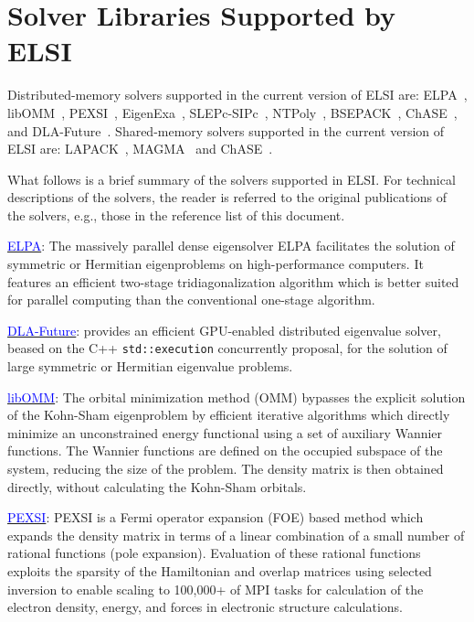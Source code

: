 \documentclass{report}
\newcommand{\tcb}[1]{\textcolor{blue}{#1}}
\begin{document}
\section{Solver Libraries Supported by ELSI}
\label{sec:solvers}
Distributed-memory solvers supported in the current version of ELSI are: ELPA~\cite{elpa_auckenthaler_2011,elpa_marek_2014,elpa_kus_2019a,elpa_kus_2019b}, libOMM~\cite{libomm_corsetti_2014}, PEXSI~\cite{pexsi_lin_2009,pexsi_lin_2013,pexsi_lin_2014,pselinv_jacquelin_2016,pexsi_jia_2017}, EigenExa~\cite{eigenexa_imamura_2011,eigenexa_fukaya_2015}, SLEPc-SIPc~\cite{slepc_hernandez_2005,sips_campos_2012,sips_keceli_2016,sips_keceli_2018}, NTPoly~\cite{ntpoly_dawson_2018}, BSEPACK~\cite{bsepack_shao_2016}, ChASE~\cite{winkelmann2019chase,chase_pasc22}, and DLA-Future~\cite{solca2024dlaf}. Shared-memory solvers supported in the current version of ELSI are: LAPACK~\cite{lapack_anderson_1999}, MAGMA~\cite{magma_tomov_2010,magma_dongarra_2014} and ChASE~\cite{winkelmann2019chase,chase_pasc22}.

What follows is a brief summary of the solvers supported in ELSI. For technical descriptions of the solvers, the reader is referred to the original publications of the solvers, e.g., those in the reference list of this document.

\href{https://elpa.mpcdf.mpg.de}{\tcb{ELPA}}: The massively parallel dense eigensolver ELPA facilitates the solution of symmetric or Hermitian eigenproblems on high-performance computers. It features an efficient two-stage tridiagonalization algorithm which is better suited for parallel computing than the conventional one-stage algorithm.

\href{https://github.com/eth-cscs/DLA-Future-Fortran}{\tcb{DLA-Future}}: provides an efficient GPU-enabled distributed eigenvalue solver, beased on the C++ \texttt{std::execution} concurrently proposal, for the solution of large symmetric or Hermitian eigenvalue problems.

\href{https://esl.cecam.org/LibOMM}{\tcb{libOMM}}: The orbital minimization method (OMM) bypasses the explicit solution of the Kohn-Sham eigenproblem by efficient iterative algorithms which directly minimize an unconstrained energy functional using a set of auxiliary Wannier functions. The Wannier functions are defined on the occupied subspace of the system, reducing the size of the problem. The density matrix is then obtained directly, without calculating the Kohn-Sham orbitals.

\href{https://pexsi.readthedocs.io/en/latest}{\tcb{PEXSI}}: PEXSI is a Fermi operator expansion (FOE) based method which expands the density matrix in terms of a linear combination of a small number of rational functions (pole expansion). Evaluation of these rational functions exploits the sparsity of the Hamiltonian and overlap matrices using selected inversion to enable scaling to 100,000+ of MPI tasks for calculation of the electron density, energy, and forces in electronic structure calculations.
\end{document}

